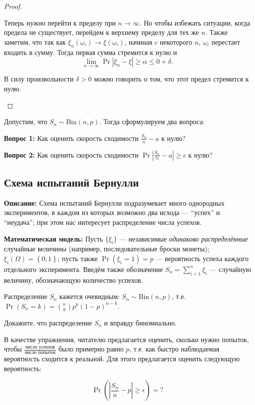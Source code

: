 \begin{proof}
\begin{itemize}
        Теперь нужно перейти к пределу при \(n \to \infty.\) Но чтобы избежать ситуации, когда предела не существует, перейдем к верхнему пределу для тех же \(n\). Также заметим, что так как \(\xi_n(\omega_i) \to \xi(\omega_i)\), начиная c некоторого \(n\), \(\omega_i\) перестает входить в сумму. Тогда первая сумма стремится к нулю и
        \[
        \overline{\lim_{n \to \infty}} \Pr{\left|\xi_n - \xi\right| \geq \alpha} \leq 0 + \delta.
        \]
        
        В силу произвольности \(\delta > 0\) можно говорить о том, что этот предел стремится к нулю. \(\qedhere\)
	\end{itemize}
\end{proof}

Допустим, что \(S_n \sim \mathrm{Bin}(n, p)\). Тогда сформулируем два вопроса:

\textbf{Вопрос 1:} Как оценить скорость сходимости \(\frac{S_n}{n} - a\) к нулю?

\textbf{Вопрос 2:} Как оценить скорость сходимости \(\Pr{\left|\frac{S_n}{n} - a\right| \geq \epsilon}\) к нулю?

\subsection{Схема испытаний Бернулли}
\textbf{Описание:} Схема испытаний Бернулли подразумевает много однородных экспериментов, в каждом из которых возможно два исхода --- ``успех'' и ``неудача''; при этом нас интересует распределение числа успехов.

\textbf{Математическая модель:} Пусть $\{\xi_i\}$ --- независимые \emph{одинаково распределённые} случайные величины (например, последовательные броски монеты); $\xi_i(\Omega) = \left\{ 0; 1 \right\}$; пусть также $\Pr(\xi_i = 1) = p$ --- вероятность успеха каждого отдельного эксперимента. Введём также обозначение $S_n = \sum\limits_{i = 1}^n \xi_i$ --- случайную величину, обозначающую количество успехов.

Распределение $S_n$ кажется очевидным: $S_n \sim \mathrm{Bin}(n, p)$, т.е. $\Pr(S_n = k) = \binom{n}{k}p^k(1-p)^{n-k}$.

\begin{exercise}
    Докажите, что распределение $S_n$ и вправду биномиально.
\end{exercise}

\begin{exercise}
    В качестве упражнения, читателю предлагается оценить, сколько нужно попыток, чтобы $\frac{\text{число успехов}}{\text{число попыток}}$ было примерно равно $p$, т.е. как быстро наблюдаемая вероятность сходится к реальной. Для этого предлагается оценить следующую вероятность:
\end{exercise}
\[
    \Pr\left(\left|\frac{S_n}{n}-p\right|\geq \epsilon\right) = ?
\]


